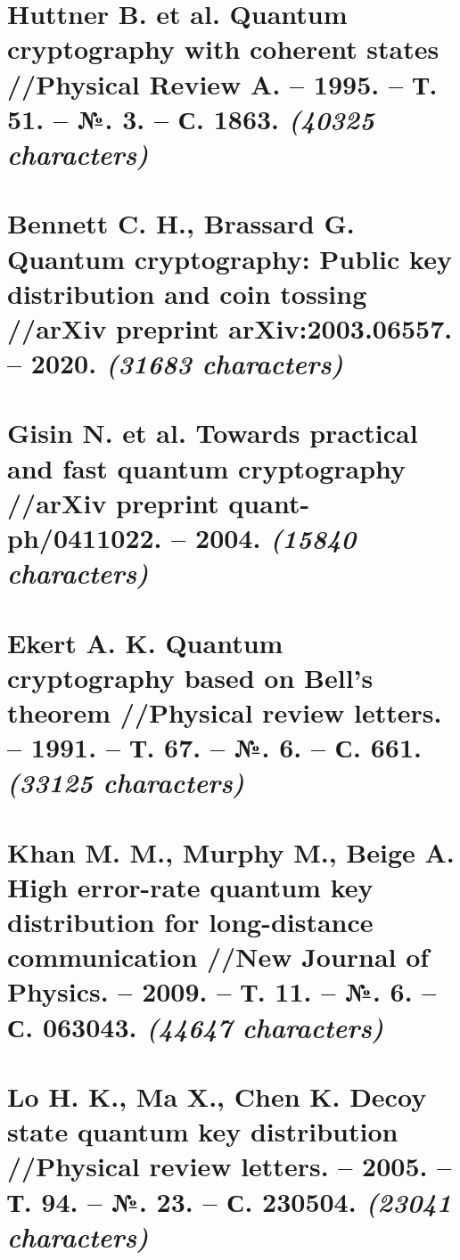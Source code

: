 

\newcommand{\trnas}{Translation}
\newcommand{\dic}{Dictionary}
\newcommand{\review}{Review}

\newcommand{\symcount}[1]{\textbf{\textit{(#1 characters)}} }




\tableofcontents
\clearpage
\section{Huttner B. et al. Quantum cryptography with coherent states //Physical Review A. – 1995. – Т. 51. – №. 3. – С. 1863. \symcount{40325}}


\clearpage
\section{Bennett C. H., Brassard G. Quantum cryptography: Public key distribution and coin tossing //arXiv preprint arXiv:2003.06557. – 2020. \symcount{31683}}


\clearpage
\section{Gisin N. et al. Towards practical and fast quantum cryptography //arXiv preprint quant-ph/0411022. – 2004. \symcount{15840}}


\clearpage
\section{Ekert A. K. Quantum cryptography based on Bell’s theorem //Physical review letters. – 1991. – Т. 67. – №. 6. – С. 661. \symcount{33125}}


\clearpage
\section{Khan M. M., Murphy M., Beige A. High error-rate quantum key distribution for long-distance communication //New Journal of Physics. – 2009. – Т. 11. – №. 6. – С. 063043. \symcount{44647}}


\clearpage
\section{Lo H. K., Ma X., Chen K. Decoy state quantum key distribution //Physical review letters. – 2005. – Т. 94. – №. 23. – С. 230504. \symcount{23041}}


